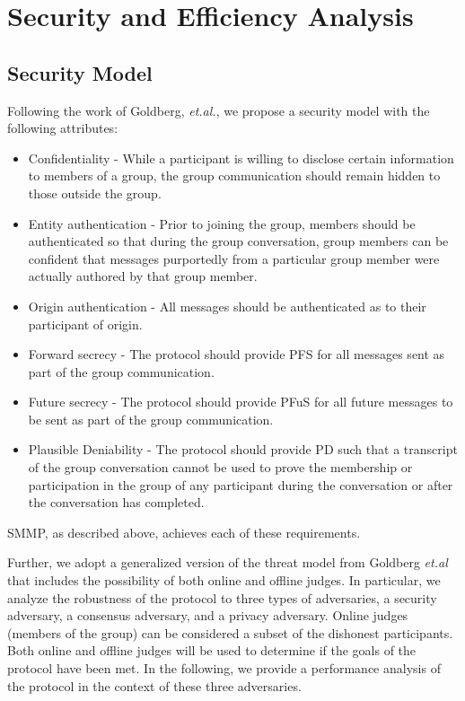 \documentclass[%
preprint,
amsmath,amssymb,
aps,
prb,
floatfix,
]{revtex4-1}
\begin{document}
\section{\label{sec:analysis}Security and Efficiency Analysis}

\subsection{\label{sec:securitymodel}Security Model}
Following the work of Goldberg, \textit{et.al.}\cite{ref:goldberg}, we propose a
security model with the following attributes:
\begin{itemize}
\item Confidentiality - While a participant is willing to disclose certain
information to members of a group, the group communication should remain hidden
to those outside the group.
\item Entity authentication - Prior to joining the group, members should be
authenticated so that during the group conversation, group members can be
confident that messages purportedly from a particular group member were
actually authored by that group member.
\item Origin authentication - All messages should be authenticated as to their
participant of origin.
\item Forward secrecy - The protocol should provide PFS for all messages sent as
part of the group communication.
\item Future secrecy - The protocol should provide PFuS for all future messages
to be sent as part of the group communication.
\item Plausible Deniability - The protocol should provide PD such that a
transcript of the group conversation cannot be used to prove the membership or
participation in
the group of any participant during the conversation or after the conversation has completed.
\end{itemize}
SMMP, as described above, achieves each of these requirements.

Further, we adopt a generalized version of the threat model from Goldberg
\textit{et.al}\cite{ref:goldberg} that includes the possibility of both online
and offline judges. In particular, we analyze the robustness of
the protocol to three types of adversaries, a security adversary, a consensus
adversary, and a privacy adversary.
Online judges (members of the group) can
be considered a subset of the dishonest participants. Both online and offline
judges will be used to determine if the goals of the protocol have been met.
In the following, we provide a performance analysis of the protocol in the
context of these three adversaries.
\end{document}
